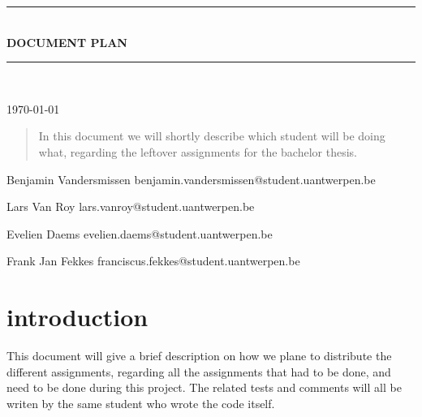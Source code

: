 \documentclass{article}
\newcommand{\HRule}[1]{\rule{\linewidth}{#1}}
\begin{document}
\begin{titlepage}
	\begin{center}
		\HRule{0.5pt} \\
		\LARGE \textbf{\uppercase{Document plan}}
		\HRule{2pt} \\ [0.5cm]
		{\normalsize \today \par}
		\vspace{2cm}
		\begin{abstract}
			\noindent
			In this document we will shortly describe which student will be doing what, regarding the leftover assignments for the bachelor thesis.
			
		\end{abstract}
		\vfill
		\vfill
		{\normalsize Benjamin Vandersmissen \scriptsize benjamin.vandersmissen@student.uantwerpen.be \par}
		{\normalsize Lars Van Roy \scriptsize lars.vanroy@student.uantwerpen.be \par}
		{\normalsize Evelien Daems \scriptsize evelien.daems@student.uantwerpen.be \par}
		{\normalsize Frank Jan Fekkes \scriptsize franciscus.fekkes@student.uantwerpen.be \par}
	\end{center}
	
	\vfill
	
	\date{}
	
	\author{}
\end{titlepage}

\newpage

\tableofcontents

\newpage

\section{introduction}
This document will give a brief description on how we plane to distribute the different assignments, regarding all the assignments that had to be done, and need to be done during this project. The related tests and comments will all be writen by the same student who wrote the code itself.
\end{document}
